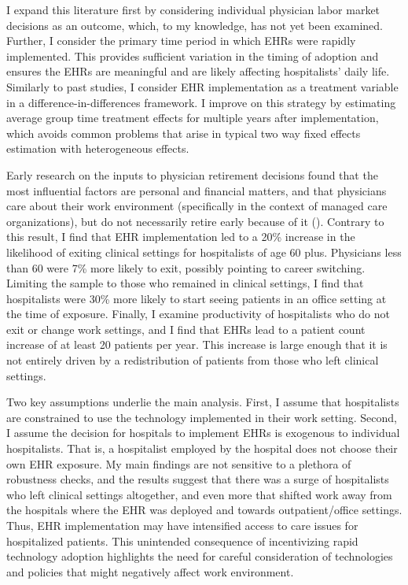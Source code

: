 \documentclass[12pt]{article}
\begin{document}
I expand this literature first by considering individual physician labor market decisions as an outcome, which, to my knowledge, has not yet been examined. Further, I consider the primary time period in which EHRs were rapidly implemented. This provides sufficient variation in the timing of adoption and ensures the EHRs are meaningful and are likely affecting hospitalists' daily life. Similarly to past studies, I consider EHR implementation as a treatment variable in a difference-in-differences framework. I improve on this strategy by estimating average group time treatment effects for multiple years after implementation, which avoids common problems that arise in typical two way fixed effects estimation with heterogeneous effects.  

Early research on the inputs to physician retirement decisions found that the most influential factors are personal and financial matters, and that physicians care about their work environment (specifically in the context of managed care organizations), but do not necessarily retire early because of it (\cite{Bahrami2002}). Contrary to this result, I find that EHR implementation led to a 20\% increase in the likelihood of exiting clinical settings for hospitalists of age 60 plus. Physicians less than 60 were 7\% more likely to exit, possibly pointing to career switching. Limiting the sample to those who remained in clinical settings, I find that hospitalists were 30\% more likely to start seeing patients in an office setting at the time of exposure. Finally, I examine productivity of hospitalists who do not exit or change work settings, and I find that EHRs lead to a patient count increase of at least 20 patients per year. This increase is large enough that it is not entirely driven by a redistribution of patients from those who left clinical settings. 

Two key assumptions underlie the main analysis. First, I assume that hospitalists are constrained to use the technology implemented in their work setting. Second, I assume the decision for hospitals to implement EHRs is exogenous to individual hospitalists. That is, a hospitalist employed by the hospital does not choose their own EHR exposure. My main findings are not sensitive to a plethora of robustness checks, and the results suggest that there was a surge of hospitalists who left clinical settings altogether, and even more that shifted work away from the hospitals where the EHR was deployed and towards outpatient/office settings. Thus, EHR implementation may have intensified access to care issues for hospitalized patients. This unintended consequence of incentivizing rapid technology adoption highlights the need for careful consideration of technologies and policies that might negatively affect work environment. 
\end{document}

